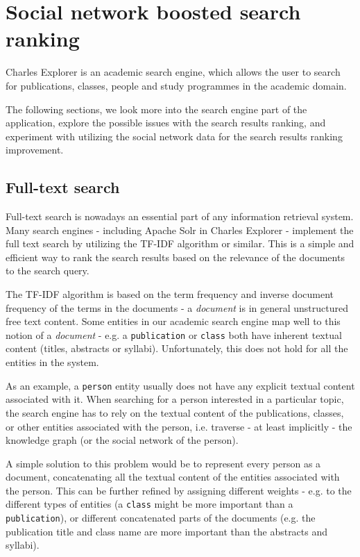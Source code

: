 \chapter{Social network boosted search ranking}

Charles Explorer is an academic search engine, which allows the user to search for publications, classes, people and study programmes in the academic domain.

The following sections, we look more into the search engine part of the application, explore the possible issues with the search results ranking, 
and experiment with utilizing the social network data for the search results ranking improvement.

\section{Full-text search}

Full-text search is nowadays an essential part of any information retrieval system. 
Many search engines - including Apache Solr in Charles Explorer - implement the full text search by utilizing the TF-IDF algorithm or similar.
This is a simple and efficient way to rank the search results based on the relevance of the documents to the search query.

The TF-IDF algorithm is based on the term frequency and inverse document frequency of the terms in the documents - a \textit{document} is in general unstructured free text content.
Some entities in our academic search engine map well to this notion of a \textit{document} - e.g. a \texttt{publication} or \texttt{class} both have inherent textual content (titles, abstracts or syllabi).
Unfortunately, this does not hold for all the entities in the system.

As an example, a \texttt{person} entity usually does not have any explicit textual content associated with it. 
When searching for a person interested in a particular topic, the search engine has to rely on the textual content of the publications, classes, 
or other entities associated with the person, i.e. traverse - at least implicitly - the knowledge graph (or the social network of the person).

A simple solution to this problem would be to represent every person as a document, concatenating all the textual content of the entities associated with the person.
This can be further refined by assigning different weights - e.g. to the different types of entities (a \texttt{class} might be more important than a \texttt{publication}), 
or different concatenated parts of the documents (e.g. the publication title and class name are more important than the abstracts and syllabi).

